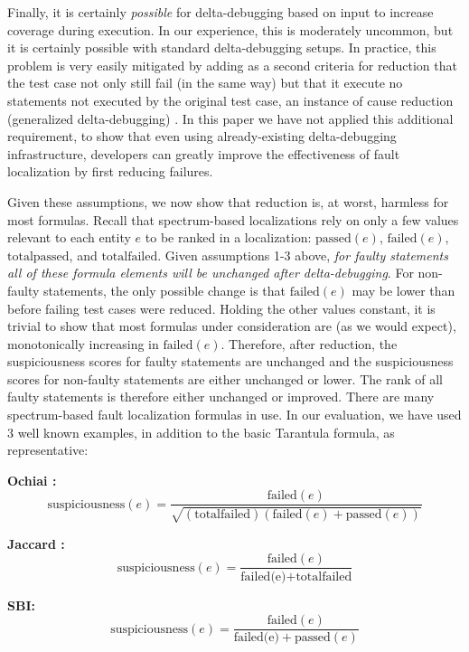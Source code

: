 Finally, it is certainly \emph{possible} for delta-debugging based on
input to increase coverage during execution.  In our experience, this
is moderately uncommon, but it is certainly possible with standard
delta-debugging setups.  In practice, this problem is very easily
mitigated by adding as a second criteria for reduction that the test
case not only still fail (in the same way) but that it execute no
statements not executed by the original test case, an instance of
cause reduction (generalized delta-debugging) \cite{ICST14}.  In this
paper we have not applied this additional requirement, to show that
even using already-existing delta-debugging infrastructure, developers
can greatly improve the effectiveness of fault localization by first
reducing failures.

Given these assumptions, we now show that reduction is, at worst,
harmless for most formulas.  Recall that spectrum-based localizations
rely on only a few values relevant to each entity $e$ to be ranked in
a localization: $\text{passed}(e)$, $\text{failed}(e)$,
$\text{totalpassed}$, and $\text{totalfailed}$.  Given assumptions 1-3
above, \emph{for faulty statements all of these formula elements will
be unchanged after delta-debugging}.  For non-faulty statements, the
only possible change is that $ \text{failed}(e)$ may be lower than
before failing test cases were reduced. Holding the other values
constant, it is trivial to show that most formulas under consideration
are (as we would expect), monotonically increasing in
$\text{failed}(e)$.  Therefore, after reduction, the suspiciousness
scores for faulty statements are unchanged and the suspiciousness
scores for non-faulty statements are either unchanged or lower.  The
rank of all faulty statements is therefore either unchanged or
improved.  There are many spectrum-based fault localization formulas
in use. In our evaluation, we have used 3 well known examples, in
addition to the basic Tarantula \cite{Jones2002} formula, as
representative:

{\bf Ochiai \cite{Ochai}:}
$$ \text{suspiciousness}(e) = \frac{\text{failed}(e)}{\sqrt{(\text{totalfailed}) (\text{failed}(e) + \text{passed}(e))}} $$

{\bf Jaccard \cite{Pinpoint}:}
$$ \text{suspiciousness}(e) = \frac{\text{failed}(e)}{\text{failed(e)} + \text{totalfailed}} $$

{\bf SBI: \cite{EmpirReduce,StatDebug}}
$$ \text{suspiciousness}(e) = \frac{\text{failed}(e)}{\text{failed(e)} + \text{passed}(e)} $$


